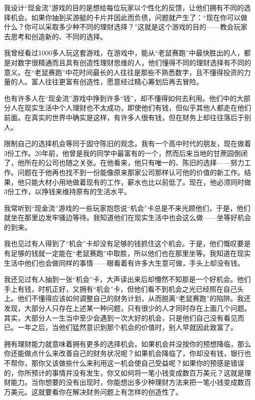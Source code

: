 我设计“现金流”游戏的目的是想给每位玩家以个性化的反馈，让他们拥有不同的选择机会。如果你抽到买游艇的卡片并因此而负债，问题就产生了：“现在你可以做什么？你可以采取多少种不同的理财选择？”这就是这个游戏的目的——教会玩家去思考和创造新的、不同的选择。

我曾经看过1000多人玩这套游戏，在游戏中，能从“老鼠赛跑”中最快胜出的人，都是对数字很精通而且具有创造性理财思维的人，他们懂得不同的理财选择有不同的意义。在“老鼠赛跑”中花时间最长的人往往是那些不熟悉数字，且不懂得投资的力量的人。富人往往更富有创造性，愿意经过精心筹划后再去冒险。

也有许多人在“现金流”游戏中挣到许多“钱”，却不懂得如何去利用。他们中的大部分人在现实生活中个人理财也不太成功，即使他们有钱，但似乎其他人都走在他们前面。在真实的世界中确实是这样，有许多人很有钱，但在财务上却往往落后于别人。

限制自己的选择机会等同于固守陈旧的观念。我有一个高中时代的朋友，现在做着3份工作。20年前，他曾是我的同学中最富有的一个，然而后来当地的甘蔗园倒闭了，他所在的公司也随之关张。在他看来，他只有唯一的、陈旧的选择——努力工作。问题在于他再也找不到一份能像原来那家公司那样认可他的价值的新工作。结果，他只能大材小用地做着现有的工作，薪水也比以前低了。现在，他必须同时做3份工作，以挣钱来维持原有的生活水平。

我常听到“现金流”游戏的一些玩家抱怨说“机会”卡总是不来光顾他们，于是，他们就坐在那里边发牢骚边等待。我知道他们在现实生活中也会这么做——坐等好机会的到来。

我也见过有人得到了“机会”卡却没有足够的钱抓住这个机会。于是，他们慨叹要是有足够的钱就一定能在“老鼠赛跑”中取胜，所以他们也在那里坐等。我知道在现实生活中他们也会做同样的事情——眼看着有许多大生意可做，手头上却没有钱。

我还见过有人抽到一张“机会”卡，大声读出来后却懵然不知那是一个好机会。他们手上有钱，时机正好，又拥有“机会”卡，但他们看不到机会之光已经照在自己头上。他们不懂得应该如何调整自己的财务计划，从而脱离“老鼠赛跑”的陷阱。我还发现，大部分人只存在上述某一种问题，只有很少的人才同时存在上面几个问题。其实，大部分人一生当中至少会遇到一次大好的机会，只是他们自己没有看见而已。一年之后，当他们猛然意识到那个机会的价值时，别人早就因此致富了。

拥有理财能力就意味着拥有更多的选择机会。如果机会并没按你的预想降临，那么你还能做点什么来改善自己的财务状况呢？如果机会降临了，你却没有钱，银行也不帮你，那你又该做些什么来利用这一机会使自己受益呢？如果你的预感是错误的，你所预计的事情并没有发生，你又如何将一笔小钱变成数百万美元？这就是理财能力。当你想要的没有出现时，你能想出多少种理财方法来把一笔小钱变成数百万美元。这就要看你在解决财务问题上有怎样的创造性了。

